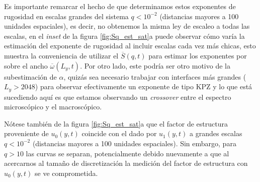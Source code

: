 Es importante remarcar el hecho de que determinamos estos exponentes de rugosidad en escalas grandes del sistema $q<10^{-2}$ (distancias mayores a 100 unidades espaciales), es decir, no obtenemos la misma ley de escaleo a todas las escalas, en el \textit{inset} de la figura \ref{fig:Sq_est_sat}a puede observar cómo varía la estimación del exponente de rugosidad al incluir escalas cada vez más chicas, esto muestra la conveniencia de utilizar el $\overline{S}(q,t)$ para estimar los exponentes por sobre el ancho $\overline{\omega}(L_y,t)$. Por otro lado, este podría ser otro motivo de la subestimación de $\alpha$, quizás sea necesario trabajar con interfaces más grandes ($L_y > 2048$) para observar efectivamente un exponente de tipo KPZ y lo que está sucediendo aquí es que estamos observando un \textit{crossover} entre el espectro microscópico y el macroscópico.  

Nótese también de la figura \ref{fig:Sq_est_sat}a que el factor de estructura proveniente de $u_0(y,t)$ coincide con el dado por $u_1(y,t)$ a grandes escalas $q<10^{-2}$ (distancias mayores a 100 unidades espaciales). Sin embargo, para $q>10$ las curvas se separan, potencialmente debido nuevamente a que al acercarnos al tamaño de discretización la medición del factor de estructura con $u_0(y,t)$ se ve comprometida. 

